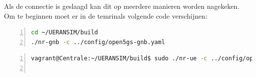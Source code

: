 Als de connectie is geslaagd kan dit op meerdere manieren worden nagekeken. Om te beginnen moet er in de temrinals volgende code verschijnen:

\begin{lstlisting}[basicstyle=\small, frame=single, breaklines=true, postbreak=\mbox{\textcolor{red}{$\hookrightarrow$}\space}, escapeinside ={\%,}, escapechar={!}, numbers=left, language=sh, caption=Verwacht run resultaat gNB]
cd ~/UERANSIM/build
./nr-gnb -c ../config/open5gs-gnb.yaml
\end{lstlisting}

\begin{lstlisting}[basicstyle=\small, frame=single, breaklines=true, postbreak=\mbox{\textcolor{red}{$\hookrightarrow$}\space}, escapeinside ={\%,}, escapechar={!}, numbers=left, language=sh, caption=Verwacht run resultaat UE]vagrant@Centrale:~/UERANSIM/build$ sudo ./nr-ue -c ../config/open5gs-ue.yaml


\end{lstlisting}

